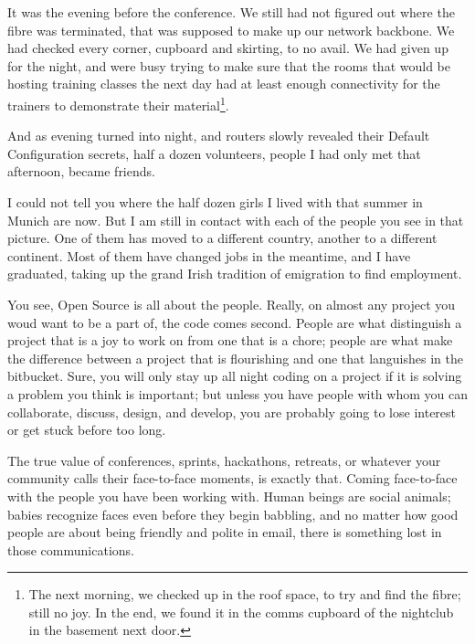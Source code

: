 It was the evening before the conference. We still had not figured out
where the fibre was terminated, that was supposed to make up our
network backbone. We had checked every corner, cupboard and skirting, to
no avail. We had given up for the night, and were busy trying to make
sure that the rooms that would be hosting training classes the next
day had at least enough connectivity for the trainers to demonstrate
their material\footnote{The next morning, we checked up in the roof space, to
try and find
the fibre; still no joy. In the end, we found it in the comms cupboard
of the nightclub in the basement next door.}.

And as evening turned into night, and routers slowly revealed their
Default Configuration secrets, half a dozen volunteers, people I had
only met that afternoon, became friends.

I could not tell you where the half dozen girls I lived with that
summer in Munich are now. But I am still in contact with each of the
people you see in that picture. One of them has moved to a different
country, another to a different continent. Most of them have changed
jobs in the meantime, and I have graduated, taking up the grand Irish
tradition of emigration to find employment.

You see, Open Source is all about the people. Really, on almost any
project you woud want to be a part of, the code comes second. People are
what distinguish a project that is a joy to work on from one that is a
chore; people are what make the difference between a project that is
flourishing and one that languishes in the bitbucket. Sure, you will
only stay up all night coding on a project if it is solving a problem
you think is important; but unless you have people with whom you can
collaborate, discuss, design, and develop, you are probably going to
lose interest or get stuck before too long.

The true value of conferences, sprints, hackathons, retreats, or
whatever your community calls their face-to-face moments, is exactly
that. Coming face-to-face with the people you have been working with.
Human beings are social animals; babies recognize faces even before
they begin babbling, and no matter how good people are about being
friendly and polite in email, there is something lost in those
communications.

